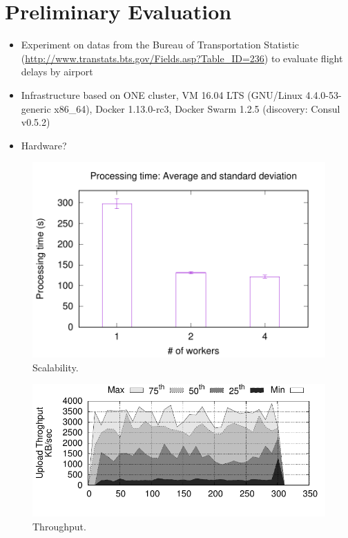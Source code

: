 \section{Preliminary Evaluation}
\label{sec:eval}

\begin{itemize}
  \item Experiment on datas from the Bureau of Transportation Statistic (\url{http://www.transtats.bts.gov/Fields.asp?Table_ID=236}) to evaluate flight delays by airport
  \item Infrastructure based on ONE cluster, VM 16.04 LTS (GNU/Linux 4.4.0-53-generic x86\_64), Docker 1.13.0-rc3, Docker Swarm 1.2.5 (discovery: Consul v0.5.2)
  \item Hardware?
\end{itemize}


\begin{figure}[t!]
  \centering
  \includegraphics[width=.99\linewidth]{images/avg_stdev}
  \caption{Scalability.}
  \label{fig:scalability}
\end{figure}

\begin{figure}[t!]
  \centering
  \includegraphics[width=.99\linewidth]{images/tput_upload}
  \caption{Throughput.}
  \label{fig:throughput}
\end{figure}
